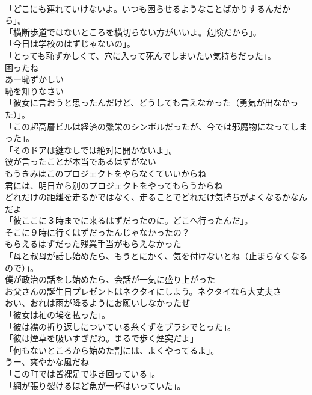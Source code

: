 \documentclass[8pt]{extreport}
\begin{document}
\begin{CJK}{UTF8}{min}
\\	「どこにも連れていけないよ。いつも困らせるようなことばかりするんだから」。	
\\	「横断歩道ではないところを横切らない方がいいよ。危険だから」。	
\\	「今日は学校のはずじゃないの」。	
\\	「とっても恥ずかしくて、穴に入って死んでしまいたい気持ちだった」。	
\\	困ったね	
\\	あー恥ずかしい	
\\	恥を知りなさい	
\\	「彼女に言おうと思ったんだけど、どうしても言えなかった（勇気が出なかった）」。	
\\	「この超高層ビルは経済の繁栄のシンボルだったが、今では邪魔物になってしまった」。	
\\	「そのドアは鍵なしでは絶対に開かないよ」。	
\\	彼が言ったことが本当であるはずがない	
\\	もうきみはこのプロジェクトをやらなくていいからね	
\\	君には、明日から別のプロジェクトをやってもらうからね	
\\	どれだけの距離を走るかではなく、走ることでどれだけ気持ちがよくなるかなんだよ	
\\	「彼ここに３時までに来るはずだったのに。どこへ行ったんだ」。	
\\	そこに９時に行くはずだったんじゃなかったの？	
\\	もらえるはずだった残業手当がもらえなかった	
\\	「母と叔母が話し始めたら、もうとにかく、気を付けないとね（止まらなくなるので）」。	
\\	僕が政治の話をし始めたら、会話が一気に盛り上がった	
\\	お父さんの誕生日プレゼントはネクタイにしよう。ネクタイなら大丈夫さ	
\\	おい、おれは雨が降るようにお願いしなかったぜ	
\\	「彼女は袖の埃を払った」。 
\\	「彼は襟の折り返しについている糸くずをブラシでとった」。	
\\	「彼は煙草を吸いすぎだね。まるで歩く煙突だよ」	
\\	「何もないところから始めた割には、よくやってるよ」。	
\\	うー、爽やかな風だね	
\\	「この町では皆裸足で歩き回っている」。	
\\	「網が張り裂けるほど魚が一杯はいっていた」。	

\end{CJK}
\end{document}
